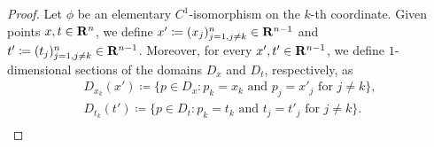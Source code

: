 \begin{proof}
    Let \(\phi\) be an elementary \(C^1\)-isomorphism on the \(k\)-th
    coordinate. Given points \(x, t \in \mathbf{R}^n\), we define \(x' \coloneq (x_j)_{j=1,
        j \neq k}^n \in \mathbf{R}^{n-1}\) and \(t' \coloneq (t_j)_{j=1, j \neq k}^n \in
    \mathbf{R}^{n-1}\). Moreover, for every \(x', t' \in \mathbf{R}^{n-1}\), we define
    \(1\)-dimensional sections of the domains \(D_x\) and \(D_t\), respectively, as
    \begin{gather*}
        D_{x_k}(x') \coloneq
        \{p \in D_x \colon p_k = x_k \text{ and } p_j = x'_j \text{ for } j \neq k\}, \\
        D_{t_k}(t') \coloneq
        \{p \in D_t \colon p_k = t_k \text{ and } t_j = t'_j \text{ for } j \neq k\}. \\
    \end{gather*}


\end{proof}
